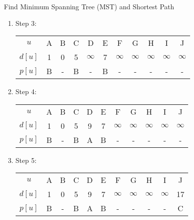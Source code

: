 \documentclass{article}
\numberwithin{table}{section}
\numberwithin{figure}{section}
\begin{document}
\begin{section}{Find Minimum Spanning Tree (MST) and Shortest Path}
\begin{enumerate}[(A)]
\begin{tcolorbox}[breakable]
\begin{enumerate}[(1)]
                \item Step 3:
                \begin{table}[H]
                    \centering
                    \begin{tabular}{c|cccccccccc}
                        \hline
                        $u$ & A & B & C & D & E & F & G & H & I & J \\
                        $d[u]$ & 1 & 0 & 5 & $\infty$ & 7 & $\infty$ & $\infty$ & $\infty$ & $\infty$ & $\infty$ \\
                        $p[u]$ & B & - & B & - & B & - & - & - & - & - \\
                        \hline
                    \end{tabular}
                \end{table}
                

                \item Step 4:
                \begin{table}[H]
                    \centering
                    \begin{tabular}{c|cccccccccc}
                        \hline
                        $u$ & A & B & C & D & E & F & G & H & I & J \\
                        $d[u]$ & 1 & 0 & 5 & 9 & 7 & $\infty$ & $\infty$ & $\infty$ & $\infty$ & $\infty$ \\
                        $p[u]$ & B & - & B & A & B & - & - & - & - & - \\
                        \hline
                    \end{tabular}
                \end{table}
                

                \item Step 5:
                \begin{table}[H]
                    \centering
                    \begin{tabular}{c|cccccccccc}
                        \hline
                        $u$ & A & B & C & D & E & F & G & H & I & J \\
                        $d[u]$ & 1 & 0 & 5 & 9 & 7 & $\infty$ & $\infty$ & $\infty$ & $\infty$ & 17 \\
                        $p[u]$ & B & - & B & A & B & - & - & - & - & C \\
                        \hline
                    \end{tabular}
                \end{table}
                


\end{enumerate}
\end{tcolorbox}
\end{enumerate}
\end{section}
\end{document}
